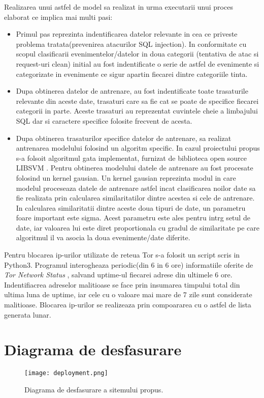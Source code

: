 Realizarea unui astfel de model sa realizat in urma executarii unui proces elaborat ce implica mai multi pasi:
\begin{itemize}
	\item  Primul pas reprezinta indentificarea datelor relevante in cea ce priveste problema tratata(prevenirea atacurilor SQL injection). In conformitate cu scopul clasificarii evenimentelor/datelor in doua categorii (tentativa de atac si request-uri clean) initial au fost  indentificate o serie de astfel de evenimente si categorizate in evenimente ce sigur apartin fiecarei dintre categoriile tinta. 
	\item Dupa  obtinerea datelor de antrenare, au fost indentificate toate trasaturile relevante din aceste date, trasaturi care sa fie cat se poate de specifice fiecarei categorii in parte. Aceste trasaturi au reprezentat cuvintele cheie a limbajului SQL dar si caractere specifice folosite frecvent de acesta.
	\item Dupa obtinerea trasaturilor specifice datelor de antrenare, sa realizat antrenarea modelului folosind un algoritm specific. In cazul proiectului propus s-a folsoit algoritmul gata implementat, furnizat de biblioteca open source LIBSVM \cite{libsvm}. Pentru obtinerea modelului datele de antrenare au fost procesate folosind un kernel gausian. Un kernel gausian reprezinta modul in care modelul proceseaza datele de antrenare astfel incat clasificarea noilor date sa fie realizata prin calcularea similaritatilor dintre acestea si cele de antrenare. In calcularea similaritatii dintre aceste doua tipuri de date, un parametru foare important este sigma. Acest parametru este ales pentru intrg setul de date, iar valoarea lui este diret proportionala cu gradul de similaritate pe care algoritmul il va asocia la doua evenimente/date diferite.
\end{itemize}

Pentru blocarea ip-urilor utilizate de reteua Tor s-a folosit un script scris in Python3. Programul interogheaza periodic(din 6 in 6 ore) informatiile oferite de \textit{Tor Network Status} \cite{tot_status}, salvand uptime-ul fiecarei adrese din ultimele 6 ore. Indentifiacrea adreselor malitioase se face prin insumarea timpului total din ultima luna de uptime, iar cele cu o valoare mai mare de 7 zile sunt considerate malitioase. Blocarea ip-urilor se realizeaza prin compoararea cu o astfel de lista generata lunar.

\section{Diagrama de desfasurare}
\begin{figure}[h]
	\centering
	\texttt{[image: deployment.png]}
	\caption{Diagrama de desfasurare a sitemului propus.}
	\label{fig:deployment}
\end{figure}

